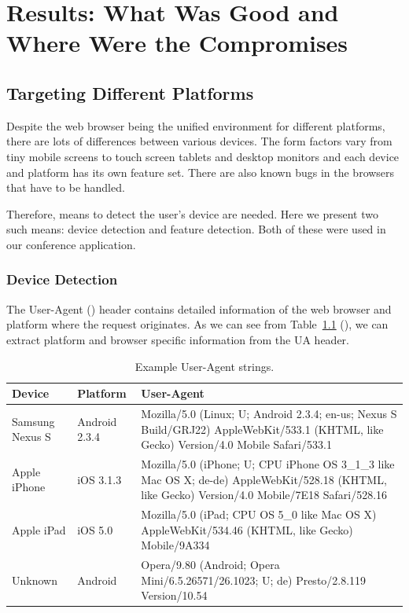 \chapter{Results: What Was Good and Where Were the Compromises}
\label{chapter:results}

\section{Targeting Different Platforms}
\label{section:targeting-platforms}

Despite the web browser being the unified environment for different
platforms, there are lots of differences between various devices. The
form factors vary from tiny mobile screens to touch screen tablets and
desktop monitors and each device and platform has its own feature
set. There are also known bugs in the browsers that have to be
handled.

Therefore, means to detect the user's device are needed. Here we
present two such means: device detection and feature detection. Both
of these were used in our conference application.

\subsection{Device Detection}
\label{subsection:device-detection}

The User-Agent ()  header contains detailed
information of the web browser and platform where the request
originates. As we can see from Table~\ref{table:user-agents}
(), we can extract platform and browser
specific information from the UA header.

\begin{table}
  \begin{tabular}{ l | l | p{7cm} }
    \textbf{Device} & \textbf{Platform} & \textbf{User-Agent} \\ \hline
    Samsung Nexus S & Android 2.3.4 & Mozilla/5.0 (Linux; U; Android 2.3.4; en-us; Nexus S Build/GRJ22) AppleWebKit/533.1 (KHTML, like Gecko) Version/4.0 Mobile Safari/533.1 \\ \hline
    Apple iPhone & iOS 3.1.3 & Mozilla/5.0 (iPhone; U; CPU iPhone OS 3\_1\_3 like Mac OS X; de-de) AppleWebKit/528.18 (KHTML, like Gecko) Version/4.0 Mobile/7E18 Safari/528.16 \\ \hline
    Apple iPad & iOS 5.0 & Mozilla/5.0 (iPad; CPU OS 5\_0 like Mac OS X) AppleWebKit/534.46 (KHTML, like Gecko) Mobile/9A334 \\ \hline
    Unknown & Android & Opera/9.80 (Android; Opera Mini/6.5.26571/26.1023; U; de) Presto/2.8.119 Version/10.54 \\ \hline
  \end{tabular}
  \label{table:user-agents}
  \caption{Example User-Agent strings.}
\end{table}

